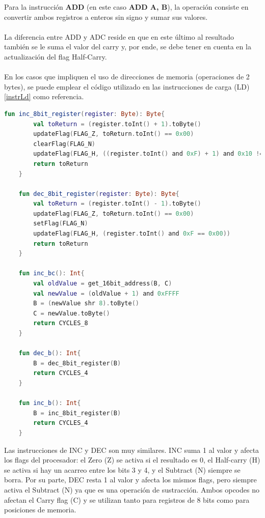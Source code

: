 Para la instrucción \textbf{ADD} (en este caso \textbf{ADD A, B}), la operación consiste en convertir ambos registros a enteros sin signo y sumar sus valores.
\\\\
La diferencia entre ADD y ADC reside en que en este último al resultado también se le suma el valor del carry y, por ende, se debe tener en cuenta en la actualización del flag Half-Carry.
\\\\
En los casos que impliquen el uso de direcciones de memoria (operaciones de 2 bytes), se puede emplear el código utilizado en las instrucciones de carga (LD) \ref{instrLd} como referencia.

\begin{lstlisting}[language=Kotlin, caption={Operaciones INC y DEC}, label={code:kotlinincdec}]
    fun inc_8bit_register(register: Byte): Byte{
        val toReturn = (register.toInt() + 1).toByte()
        updateFlag(FLAG_Z, toReturn.toInt() == 0x00)
        clearFlag(FLAG_N)
        updateFlag(FLAG_H, ((register.toInt() and 0xF) + 1) and 0x10 != 0x00)
        return toReturn
    }

    fun dec_8bit_register(register: Byte): Byte{
        val toReturn = (register.toInt() - 1).toByte()
        updateFlag(FLAG_Z, toReturn.toInt() == 0x00)
        setFlag(FLAG_N)
        updateFlag(FLAG_H, (register.toInt() and 0xF == 0x00))
        return toReturn
    }

    fun inc_bc(): Int{
        val oldValue = get_16bit_address(B, C)
        val newValue = (oldValue + 1) and 0xFFFF
        B = (newValue shr 8).toByte()
        C = newValue.toByte()
        return CYCLES_8
    }

    fun dec_b(): Int{
        B = dec_8bit_register(B)
        return CYCLES_4
    }

    fun inc_b(): Int{
        B = inc_8bit_register(B)
        return CYCLES_4
    }
\end{lstlisting}

Las instrucciones de INC y DEC son muy similares. INC suma 1 al valor y afecta los flags del procesador: el Zero (Z) se activa si el resultado es 0, el Half-carry (H) se activa si hay un acarreo entre los bits 3 y 4, y el Subtract (N) siempre se borra. Por su parte, DEC resta 1 al valor y afecta los mismos flags, pero siempre activa el Subtract (N) ya que es una operación de sustracción. Ambos opcodes no afectan el Carry flag (C) y se utilizan tanto para registros de 8 bits como para posiciones de memoria.

